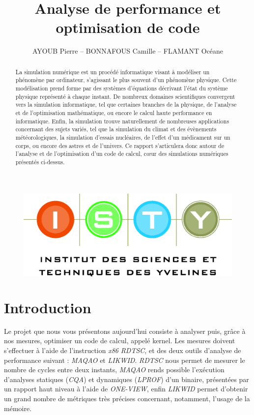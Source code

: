 \documentclass[12pt,a4paper]{article}
\begin{document}
\title{Analyse de performance et optimisation de code}
\author{AYOUB Pierre -- BONNAFOUS Camille -- FLAMANT Océane}

\maketitle

\begin{figure}[b]
    \centering
    \includegraphics[scale=0.3]{figures/isty.jpg}
\end{figure}

\newpage
\begin{abstract}

La simulation numérique est un procédé informatique visant à modéliser un
phénomène par ordinateur, s'agissant le plus souvent d'un phénomène
physique. Cette modélisation prend forme par des systèmes d'équations
décrivant l'état du système physique représenté à chaque instant. De
nombreux domaines scientifiques convergent vers la simulation
informatique, tel que certaines branches de la physique, de l'analyse
et de l'optimisation mathématique, ou encore le calcul haute
performance en informatique. Enfin, la simulation trouve naturellement
de nombreuses applications concernant des sujets variés, tel que la
simulation du climat et des évènements météorologiques, la simulation
d'essais nucléaires, de l'effet d'un médicament sur un corps, ou encore
des astres et de l'univers. Ce rapport s'articulera donc autour de l'analyse et
de l'optimisation d'un code de calcul, cœur des simulations numériques
présentés ci-dessus.

\end{abstract}

\tableofcontents

\section{Introduction}

Le projet que nous vous présentons aujourd'hui consiste à analyser puis, grâce à
nos mesures, optimiser un code de calcul, appelé kernel. Les mesures doivent
s'effectuer à l'aide de l'instruction \textit{x86} \textit{RDTSC}, et des deux
outils d'analyse de performance suivant : \textit{MAQAO} et \textit{LIKWID}.
\textit{RDTSC} nous permet de mesurer le nombre de cycles entre deux instants,
\textit{MAQAO} rends possible l'exécution d'analyses statiques (\textit{CQA}) et
dynamiques (\textit{LPROF}) d'un binaire, présentées par un rapport haut niveau
à l'aide de \textit{ONE-VIEW}, enfin \textit{LIKWID} permet d'obtenir un grand
nombre de métriques très précises concernant, notamment, l'usage de la mémoire.
\end{document}
